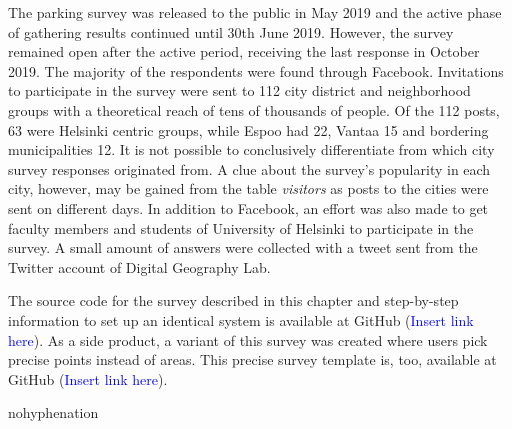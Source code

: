 The parking survey was released to the public in May 2019 and the active phase of gathering results continued until 30th June 2019. However, the survey remained open after the active period, receiving the last response in October 2019. The majority of the respondents were found through Facebook. Invitations to participate in the survey were sent to 112 city district and neighborhood groups with a theoretical reach of tens of thousands of people. Of the 112 posts, 63 were Helsinki centric groups, while Espoo had 22, Vantaa 15 and bordering municipalities 12. It is not possible to conclusively differentiate from which city survey responses originated from. A clue about the survey's popularity in each city, however, may be gained from the table \textit{visitors} as posts to the cities were sent on different days. In addition to Facebook, an effort was also made to get faculty members and students of University of Helsinki to participate in the survey. A small amount of answers were collected with a tweet sent from the Twitter account of Digital Geography Lab.

The source code for the survey described in this chapter and step-by-step information to set up an identical system is available at GitHub (\textcolor{blue}{Insert link here}). As a side product, a variant of this survey was created where users pick precise points instead of areas. This precise survey template is, too, available at GitHub (\textcolor{blue}{Insert link here}).

\begin{hyphenrules}{nohyphenation}
    \begin{table}[H]
        \centering
        \setlength\tabcolsep{1pt}
        \caption{Records} \label{tab:recordstab}
    \end{table} 
\end{hyphenrules}

